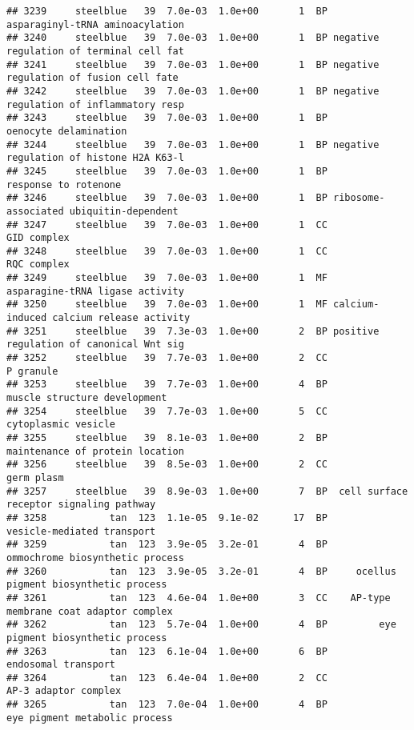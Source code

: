 \documentclass[]{article}
\begin{document}
\begin{verbatim}
## 3239     steelblue   39  7.0e-03  1.0e+00       1  BP          asparaginyl-tRNA aminoacylation
## 3240     steelblue   39  7.0e-03  1.0e+00       1  BP negative regulation of terminal cell fat
## 3241     steelblue   39  7.0e-03  1.0e+00       1  BP negative regulation of fusion cell fate 
## 3242     steelblue   39  7.0e-03  1.0e+00       1  BP negative regulation of inflammatory resp
## 3243     steelblue   39  7.0e-03  1.0e+00       1  BP                    oenocyte delamination
## 3244     steelblue   39  7.0e-03  1.0e+00       1  BP negative regulation of histone H2A K63-l
## 3245     steelblue   39  7.0e-03  1.0e+00       1  BP                     response to rotenone
## 3246     steelblue   39  7.0e-03  1.0e+00       1  BP ribosome-associated ubiquitin-dependent 
## 3247     steelblue   39  7.0e-03  1.0e+00       1  CC                              GID complex
## 3248     steelblue   39  7.0e-03  1.0e+00       1  CC                              RQC complex
## 3249     steelblue   39  7.0e-03  1.0e+00       1  MF          asparagine-tRNA ligase activity
## 3250     steelblue   39  7.0e-03  1.0e+00       1  MF calcium-induced calcium release activity
## 3251     steelblue   39  7.3e-03  1.0e+00       2  BP positive regulation of canonical Wnt sig
## 3252     steelblue   39  7.7e-03  1.0e+00       2  CC                                P granule
## 3253     steelblue   39  7.7e-03  1.0e+00       4  BP             muscle structure development
## 3254     steelblue   39  7.7e-03  1.0e+00       5  CC                      cytoplasmic vesicle
## 3255     steelblue   39  8.1e-03  1.0e+00       2  BP          maintenance of protein location
## 3256     steelblue   39  8.5e-03  1.0e+00       2  CC                               germ plasm
## 3257     steelblue   39  8.9e-03  1.0e+00       7  BP  cell surface receptor signaling pathway
## 3258           tan  123  1.1e-05  9.1e-02      17  BP               vesicle-mediated transport
## 3259           tan  123  3.9e-05  3.2e-01       4  BP          ommochrome biosynthetic process
## 3260           tan  123  3.9e-05  3.2e-01       4  BP     ocellus pigment biosynthetic process
## 3261           tan  123  4.6e-04  1.0e+00       3  CC    AP-type membrane coat adaptor complex
## 3262           tan  123  5.7e-04  1.0e+00       4  BP         eye pigment biosynthetic process
## 3263           tan  123  6.1e-04  1.0e+00       6  BP                      endosomal transport
## 3264           tan  123  6.4e-04  1.0e+00       2  CC                     AP-3 adaptor complex
## 3265           tan  123  7.0e-04  1.0e+00       4  BP            eye pigment metabolic process

\end{verbatim}
\end{document}
